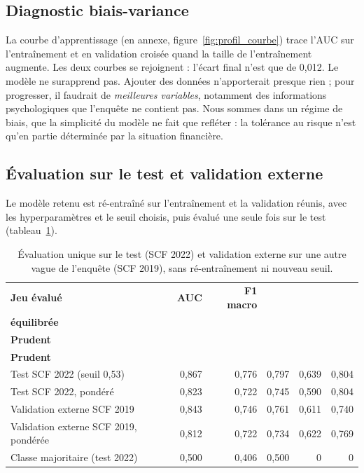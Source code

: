 \subsection{Diagnostic biais-variance}

La courbe d'apprentissage (en annexe, figure~\ref{fig:profil_courbe}) trace l'AUC sur l'entraînement et en validation croisée quand la taille de l'entraînement augmente. Les deux courbes se rejoignent : l'écart final n'est que de 0,012. Le modèle ne surapprend pas. Ajouter des données n'apporterait presque rien ; pour progresser, il faudrait de \emph{meilleures variables}, notamment des informations psychologiques que l'enquête ne contient pas. Nous sommes dans un régime de biais, que la simplicité du modèle ne fait que refléter : la tolérance au risque n'est qu'en partie déterminée par la situation financière.

\subsection{Évaluation sur le test et validation externe}

Le modèle retenu est ré-entraîné sur l'entraînement et la validation réunis, avec les hyperparamètres et le seuil choisis, puis évalué une seule fois sur le test (tableau~\ref{tab:profil_test}).

\begin{table}[!htb]
  \centering
  \small
  \caption{Évaluation unique sur le test (SCF 2022) et validation externe sur une autre vague de l'enquête (SCF 2019), sans ré-entraînement ni nouveau seuil.}
  \label{tab:profil_test}
  \begin{tabular}{@{}l r r r r r@{}}
    \toprule
    \textbf{Jeu évalué} & \textbf{AUC} & \textbf{F1 macro} & \shortstack[r]{\textbf{Accuracy}\\\textbf{équilibrée}} & \shortstack[r]{\textbf{Précision}\\\textbf{Prudent}} & \shortstack[r]{\textbf{Rappel}\\\textbf{Prudent}} \\
    \midrule
    Test SCF 2022 (seuil 0,53)              & 0,867 & 0,776 & 0,797 & 0,639 & 0,804 \\
    Test SCF 2022, pondéré                  & 0,823 & 0,722 & 0,745 & 0,590 & 0,804 \\
    Validation externe SCF 2019             & 0,843 & 0,746 & 0,761 & 0,611 & 0,740 \\
    Validation externe SCF 2019, pondérée   & 0,812 & 0,722 & 0,734 & 0,622 & 0,769 \\
    Classe majoritaire (test 2022)          & 0,500 & 0,406 & 0,500 & 0     & 0     \\
    \bottomrule
  \end{tabular}
\end{table}

